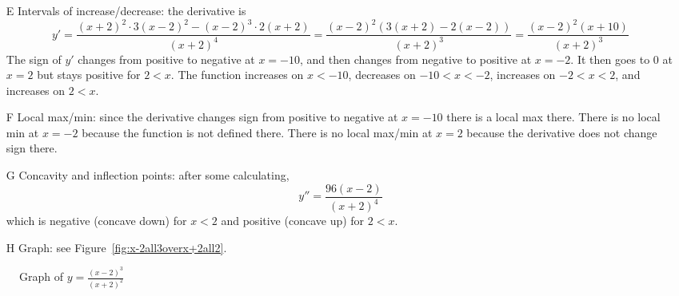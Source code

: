 \documentclass{article}
\newcommand{\ds}{\displaystyle}
\begin{document}
\begin{enumerate}
\begin{enumerate}
\begin{itemize}
    \item[E] Intervals of increase/decrease: the derivative is
      \begin{displaymath}
        y' = \frac{(x+2)^2\cdot 3(x-2)^2 - (x-2)^3\cdot 2(x+2)}{(x+2)^4}
        = \frac{(x-2)^2(3(x+2)-2(x-2))}{(x+2)^3}
        = \frac{(x-2)^2(x+10)}{(x+2)^3}
      \end{displaymath}
      The sign of $y'$ changes from positive to negative at $x=-10$,
      and then changes from negative to positive at $x=-2$.  It then
      goes to $0$ at $x=2$ but stays positive for $2<x$.  The function
      increases on $x<-10$, decreases on $-10<x<-2$, increases on
      $-2<x<2$, and increases on $2<x$.
    \item[F] Local max/min: since the derivative changes sign from
      positive to negative at $x=-10$ there is a local max there.
      There is no local min at $x=-2$ because the function is not
      defined there.  There is no local max/min at $x=2$ because the
      derivative does not change sign there.
    \item[G] Concavity and inflection points: after some calculating,
      \begin{displaymath}
        y''=\frac{96(x-2)}{(x+2)^4}
      \end{displaymath}
      which is negative (concave down) for $x<2$ and positive (concave
      up) for $2<x$.
    \item[H] Graph: see Figure~\ref{fig:x-2all3overx+2all2}.
    \end{itemize}
  \end{enumerate}
  \begin{figure}[htbp]
    \centering
    \caption{Graph of $\ds y=\frac{(x-2)^3}{(x+2)^2}$}

\end{figure}
\end{enumerate}
\end{document}

